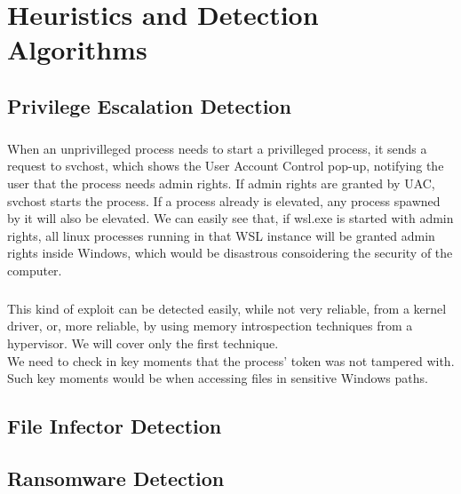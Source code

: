 \chapter{Heuristics and Detection Algorithms}
    \section{Privilege Escalation Detection}
    \paragraph{}
    When an unprivilleged process needs to start a privilleged process, it sends a request to svchost, which shows the User Account Control pop-up,
    notifying the user that the process needs admin rights. If admin rights are granted by UAC, svchost starts the process. If a process already
    is elevated, any process spawned by it will also be elevated. We can easily see that, if wsl.exe is started with admin rights, all linux
    processes running in that WSL instance will be granted admin rights inside Windows, which would be disastrous consoidering the security
    of the computer.
    \paragraph{}
    This kind of exploit can be detected easily, while not very reliable, from a kernel driver, or, more reliable, by using memory introspection
    techniques from a hypervisor. We will cover only the first technique.\\
    We need to check in key moments that the process' token was not tampered with. Such key moments would be when accessing files in sensitive
    Windows paths.
    \section{File Infector Detection}
    \section{Ransomware Detection}